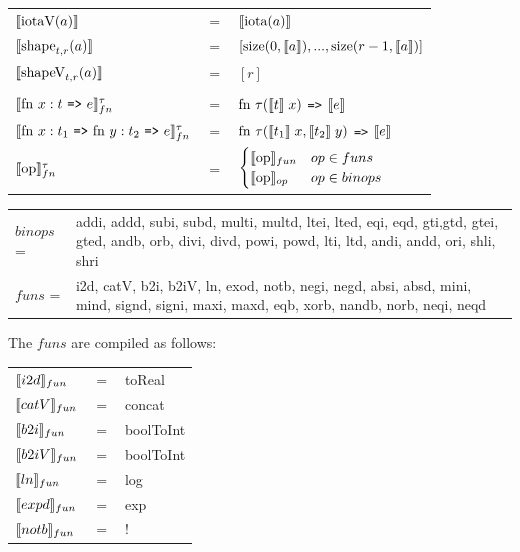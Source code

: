 \documentclass[11pt]{article}
\begin{document}
\begin{flushleft}
\begin{tabular}{@{}l c l}
$\llbracket \text{iotaV}(a) \rrbracket$ & $=$ & $\llbracket \text{iota}(a) \rrbracket$\\

$\llbracket \text{shape}_{t,r}(a) \rrbracket$ & $=$ & $[\text{size}(0,\llbracket a \rrbracket),...,\text{size}(r-1,\llbracket a \rrbracket)]$\\

$\llbracket \text{shapeV}_{t,r}(a) \rrbracket$ & $=$ & $[r]$\\
\\

$\evals{ \text{fn } x:t $ {\tt =>} $ e}^{\tau}_{fn} $ & $=$ & $ \text{fn } \tau (\llbracket t \rrbracket\; x) $ {\tt =>} $ \llbracket e \rrbracket$\\
$\evals{ \text{fn } x:t_1$ {\tt =>} $\text{fn } y:t_2 $ {\tt =>} $ e}^{\tau}_{fn} $ & $=$ & $ \text{fn } \tau (\llbracket t_1 \rrbracket\; x, \llbracket t_2 \rrbracket \; y) $ {\tt =>} $ \llbracket e \rrbracket$\\
$\llbracket \text{op} \rrbracket^{\tau}_{fn}$ & = & $ \begin{cases} \llbracket \text{op} \rrbracket_{fun} & op \in funs \\ \llbracket \text{op} \rrbracket_{op} & op \in binops \end{cases}$

\end{tabular}
\begin{tabu} to \linewidth { l X}
$binops$ =& addi, addd, subi, subd, multi, multd, ltei, lted, eqi, eqd, gti,gtd, gtei, gted, andb, orb, divi, divd, powi, powd,
lti, ltd, andi, andd, ori, shli, shri\\
$funs$ =& i2d, catV, b2i, b2iV, ln, exod, notb, negi, negd, absi, absd, mini, mind, signd, signi, maxi, maxd, eqb, xorb,
nandb, norb, neqi, neqd
\end{tabu}
\end{flushleft}
\restoregeometry

The $funs$ are compiled as follows:\\
\begin{tabular}{l c l}
$\llbracket i2d \rrbracket_{fun}$ & $=$ & toReal\\ 
$\llbracket catV \rrbracket_{fun}$ & $=$ & concat\\ 
$\llbracket b2i \rrbracket_{fun}$ & $=$ & boolToInt\\ 
$\llbracket b2iV \rrbracket_{fun}$ & $=$ & boolToInt\\ 
$\llbracket ln \rrbracket_{fun}$ & $=$ & log\\ 
$\llbracket expd \rrbracket_{fun}$ & $=$ & exp\\ 
$\llbracket notb \rrbracket_{fun}$ & $=$ & !\\ 
\end{tabular}\\
\end{document}
